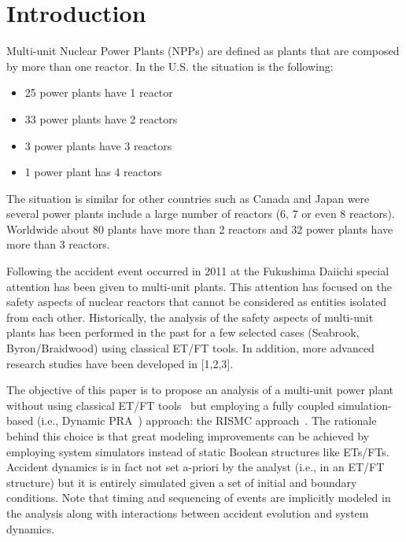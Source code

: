 \section{Introduction}
\label{sec:introduction}

Multi-unit Nuclear Power Plants (NPPs) are defined as plants that are composed by more than one reactor. 
In the U.S. the situation is the following:
\begin{itemize}
  \item 25 power plants have 1 reactor
  \item 33 power plants have 2 reactors
  \item 3 power plants have 3 reactors
  \item 1 power plant has 4 reactors
\end{itemize}
The situation is similar for other countries such as Canada and Japan were 
several power plants include a large number of reactors (6, 7 or even 8 reactors). 
Worldwide about 80 plants have more than 2 reactors and 32 power plants have more than 3 reactors. 

Following the accident event occurred in 2011 at the Fukushima Daiichi special 
attention has been given to multi-unit plants. This attention has focused on the 
safety aspects of nuclear reactors that cannot be considered as entities isolated from each other. 
Historically, the analysis of the safety aspects of multi-unit plants has been performed 
in the past for a few selected cases (Seabrook, Byron/Braidwood) using classical ET/FT tools. 
In addition, more advanced research studies have been developed in [1,2,3]. 

The objective of this paper is to propose an analysis of a multi-unit power plant without 
using classical ET/FT tools~\cite{Nureg1150} but employing a fully coupled simulation-based 
(i.e., Dynamic PRA~\cite{DynamicReliabilityMonteCarlo}) approach: the RISMC approach~\cite{RISMC,mandelliNewAlgo}. 
The rationale behind this choice 
is that great modeling improvements can be achieved by employing system simulators instead 
of static Boolean structures like ETs/FTs. 
Accident dynamics is in fact not set a-priori by the analyst (i.e., in an ET/FT structure) 
but it is entirely simulated given a set of initial and boundary conditions. Note that timing and 
sequencing of events are implicitly modeled in the analysis along with interactions between 
accident evolution and system dynamics.
